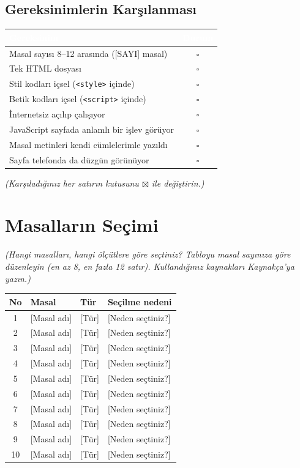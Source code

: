 \documentclass[12pt,a4paper]{article}
\newcommand{\aciklama}[1]{{\color{gray}\itshape (#1)}}
\begin{document}
\subsection{Gereksinimlerin Karşılanması}
\begin{center}
\begin{tabular}{@{}p{8.2cm}c@{}}
\toprule
\rowcolor{ana}\textcolor{white}{\textbf{Gereksinim}} & \textcolor{white}{\textbf{Durum}} \\
\midrule
Masal sayısı 8--12 arasında ([SAYI] masal)         & $\square$ \\
Tek HTML dosyası                                    & $\square$ \\
Stil kodları içsel (\texttt{<style>} içinde)        & $\square$ \\
Betik kodları içsel (\texttt{<script>} içinde)      & $\square$ \\
İnternetsiz açılıp çalışıyor                        & $\square$ \\
JavaScript sayfada anlamlı bir işlev görüyor        & $\square$ \\
Masal metinleri kendi cümlelerimle yazıldı          & $\square$ \\
Sayfa telefonda da düzgün görünüyor                 & $\square$ \\
\bottomrule
\end{tabular}
\end{center}
\aciklama{Karşıladığınız her satırın kutusunu $\boxtimes$ ile değiştirin.}

\section{Masalların Seçimi}
\aciklama{Hangi masalları, hangi ölçütlere göre seçtiniz? Tabloyu masal sayınıza göre
düzenleyin (en az 8, en fazla 12 satır). Kullandığınız kaynakları Kaynakça'ya yazın.}

\begin{longtable}{@{}cp{4cm}p{3cm}p{5.4cm}@{}}
\toprule
\textbf{No} & \textbf{Masal} & \textbf{Tür} & \textbf{Seçilme nedeni} \\
\midrule
\endhead
1 & [Masal adı] & [Tür] & [Neden seçtiniz?] \\
2 & [Masal adı] & [Tür] & [Neden seçtiniz?] \\
3 & [Masal adı] & [Tür] & [Neden seçtiniz?] \\
4 & [Masal adı] & [Tür] & [Neden seçtiniz?] \\
5 & [Masal adı] & [Tür] & [Neden seçtiniz?] \\
6 & [Masal adı] & [Tür] & [Neden seçtiniz?] \\
7 & [Masal adı] & [Tür] & [Neden seçtiniz?] \\
8 & [Masal adı] & [Tür] & [Neden seçtiniz?] \\
9 & [Masal adı] & [Tür] & [Neden seçtiniz?] \\
10 & [Masal adı] & [Tür] & [Neden seçtiniz?] \\
\bottomrule
\end{longtable}
\end{document}
